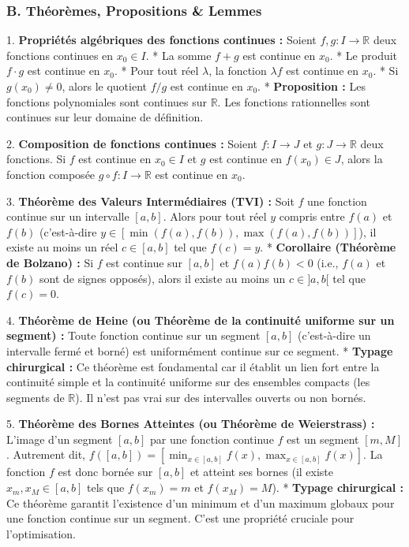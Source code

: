 \documentclass[12pt,a4paper]{report}
\begin{document}
\subsubsection{B. Théorèmes, Propositions \& Lemmes}

1.  \textbf{Propriétés algébriques des fonctions continues :}
    Soient $f, g : I \to \mathbb{R}$ deux fonctions continues en $x_0 \in I$.
    *   La somme $f+g$ est continue en $x_0$.
    *   Le produit $f \cdot g$ est continue en $x_0$.
    *   Pour tout réel $\lambda$, la fonction $\lambda f$ est continue en $x_0$.
    *   Si $g(x_0) \neq 0$, alors le quotient $f/g$ est continue en $x_0$.
    *   \textbf{Proposition :} Les fonctions polynomiales sont continues sur $\mathbb{R}$. Les fonctions rationnelles sont continues sur leur domaine de définition.

2.  \textbf{Composition de fonctions continues :}
    Soient $f : I \to J$ et $g : J \to \mathbb{R}$ deux fonctions. Si $f$ est continue en $x_0 \in I$ et $g$ est continue en $f(x_0) \in J$, alors la fonction composée $g \circ f : I \to \mathbb{R}$ est continue en $x_0$.

3.  \textbf{Théorème des Valeurs Intermédiaires (TVI) :}
    Soit $f$ une fonction continue sur un intervalle $[a, b]$. Alors pour tout réel $y$ compris entre $f(a)$ et $f(b)$ (c'est-à-dire $y \in [\min(f(a), f(b)), \max(f(a), f(b))]$), il existe au moins un réel $c \in [a, b]$ tel que $f(c) = y$.
    *   \textbf{Corollaire (Théorème de Bolzano) :} Si $f$ est continue sur $[a, b]$ et $f(a)f(b) < 0$ (i.e., $f(a)$ et $f(b)$ sont de signes opposés), alors il existe au moins un $c \in ]a, b[$ tel que $f(c) = 0$.

4.  \textbf{Théorème de Heine (ou Théorème de la continuité uniforme sur un segment) :}
    Toute fonction continue sur un segment $[a, b]$ (c'est-à-dire un intervalle fermé et borné) est uniformément continue sur ce segment.
    *   \textbf{Typage chirurgical :} Ce théorème est fondamental car il établit un lien fort entre la continuité simple et la continuité uniforme sur des ensembles compacts (les segments de $\mathbb{R}$). Il n'est pas vrai sur des intervalles ouverts ou non bornés.

5.  \textbf{Théorème des Bornes Atteintes (ou Théorème de Weierstrass) :}
    L'image d'un segment $[a, b]$ par une fonction continue $f$ est un segment $[m, M]$. Autrement dit, $f([a, b]) = [\min_{x \in [a,b]} f(x), \max_{x \in [a,b]} f(x)]$. La fonction $f$ est donc bornée sur $[a, b]$ et atteint ses bornes (il existe $x_m, x_M \in [a, b]$ tels que $f(x_m) = m$ et $f(x_M) = M$).
    *   \textbf{Typage chirurgical :} Ce théorème garantit l'existence d'un minimum et d'un maximum globaux pour une fonction continue sur un segment. C'est une propriété cruciale pour l'optimisation.
\end{document}
